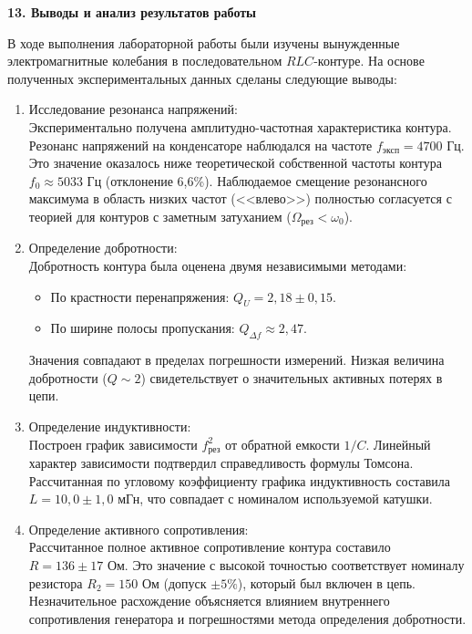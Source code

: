 \documentclass[12pt,fleqn]{article}
\begin{document}
\begin{justify}
    \textbf{13. Выводы и анализ результатов работы}

    В ходе выполнения лабораторной работы были изучены вынужденные электромагнитные колебания в последовательном $RLC$-контуре. На основе полученных экспериментальных данных сделаны следующие выводы:

    \begin{enumerate}
        \item Исследование резонанса напряжений: \\
        Экспериментально получена амплитудно-частотная характеристика контура. Резонанс напряжений на конденсаторе наблюдался на частоте $f_{\text{эксп}} = 4700$ Гц. Это значение оказалось ниже теоретической собственной частоты контура $f_0 \approx 5033$ Гц (отклонение 6,6\%). Наблюдаемое смещение резонансного максимума в область низких частот (<<влево>>) полностью согласуется с теорией для контуров с заметным затуханием ($\Omega_{\text{рез}} < \omega_0$).

        \item Определение добротности: \\
        Добротность контура была оценена двумя независимыми методами:
        \begin{itemize}
            \item По крастности перенапряжения: $Q_U = 2{,}18 \pm 0{,}15$.
            \item По ширине полосы пропускания: $Q_{\Delta f} \approx 2{,}47$.
        \end{itemize}
        Значения совпадают в пределах погрешности измерений. Низкая величина добротности ($Q \sim 2$) свидетельствует о значительных активных потерях в цепи.

        \item Определение индуктивности: \\
        Построен график зависимости $f_{\text{рез}}^2$ от обратной емкости $1/C$. Линейный характер зависимости подтвердил справедливость формулы Томсона. Рассчитанная по угловому коэффициенту графика индуктивность составила $L = 10{,}0 \pm 1{,}0$ мГн, что совпадает с номиналом используемой катушки.

        \item Определение активного сопротивления: \\
        Рассчитанное полное активное сопротивление контура составило $R = 136 \pm 17$ Ом. Это значение с высокой точностью соответствует номиналу резистора $R_2 = 150$ Ом (допуск $\pm 5\%$), который был включен в цепь. Незначительное расхождение объясняется влиянием внутреннего сопротивления генератора и погрешностями метода определения добротности.
    \end{enumerate}

\end{justify}
\end{document}
